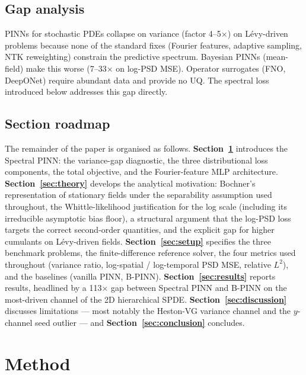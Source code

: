 \documentclass[review,12pt]{elsarticle}
\begin{document}
\subsection{Gap analysis}
\label{subsec:gap-analysis}

PINNs for stochastic PDEs collapse on variance (factor 4--5×) on Lévy-driven problems because none of the standard fixes (Fourier features, adaptive sampling, NTK reweighting) constrain the predictive spectrum. Bayesian PINNs (mean-field) make this worse (7--33× on log-PSD MSE). Operator surrogates (FNO, DeepONet) require abundant data and provide no UQ. The spectral loss introduced below addresses this gap directly.
\subsection{Section roadmap}
\label{subsec:roadmap}

The remainder of the paper is organised as follows.
\textbf{Section~\ref{sec:method}} introduces the Spectral PINN: the
variance-gap diagnostic, the three distributional loss components,
the total objective, and the Fourier-feature MLP architecture.
\textbf{Section~\ref{sec:theory}} develops the analytical
motivation: Bochner's representation of stationary fields under the
separability assumption used throughout, the Whittle-likelihood
justification for the log scale (including its irreducible
asymptotic bias floor), a structural argument that the log-PSD loss
targets the correct second-order quantities, and the explicit gap
for higher cumulants on L\'evy-driven fields.
\textbf{Section~\ref{sec:setup}} specifies the three benchmark
problems, the finite-difference reference solver, the four metrics
used throughout (variance ratio, log-spatial / log-temporal PSD
MSE, relative \(L^2\)), and the baselines (vanilla PINN, B-PINN).
\textbf{Section~\ref{sec:results}} reports results, headlined by a
113\(\times\) gap between Spectral PINN and B-PINN on the
most-driven channel of the 2D hierarchical SPDE.
\textbf{Section~\ref{sec:discussion}} discusses limitations ---
most notably the Heston-VG variance channel and the \(y\)-channel
seed outlier --- and \textbf{Section~\ref{sec:conclusion}}
concludes.

\section{Method}
\label{sec:method}
\end{document}

